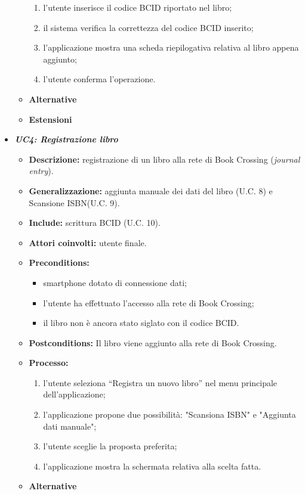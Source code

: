 \begin{itemize}
\begin{itemize}
\begin{enumerate}
			\item l’utente inserisce il codice BCID riportato nel libro;
			\item il sistema verifica la correttezza del codice BCID inserito;
			\item l’applicazione mostra una scheda riepilogativa relativa al libro appena aggiunto;
			\item  l’utente conferma l’operazione.
		\end{enumerate}
		\item \textbf{Alternative}
		\item \textbf{Estensioni}
	\end{itemize}
	\item \textbf{\textit{UC4: Registrazione libro}}
	\begin{itemize}
		\item \textbf{Descrizione:} registrazione di un libro alla rete di Book Crossing (\textit{journal entry}).
		\item \textbf{Generalizzazione:} aggiunta manuale dei dati del libro (U.C. 8) e Scansione ISBN(U.C. 9).
		\item \textbf{Include:} scrittura BCID (U.C. 10).
		\item \textbf{Attori coinvolti:} utente finale.
		\item \textbf{Preconditions:}
		\begin{itemize}
			\item smartphone dotato di connessione dati;
			\item l’utente ha effettuato l’accesso alla rete di Book Crossing;
			\item il libro non è ancora stato siglato con il codice BCID.
		\end{itemize}
		\item \textbf{Postconditions:} Il libro viene aggiunto alla rete di Book Crossing.		
		\item \textbf{Processo:} 
		\begin{enumerate}
			\item l’utente seleziona “Registra un nuovo libro” nel menu principale dell’applicazione;
			\item l’applicazione propone due possibilità: "Scansiona ISBN" e "Aggiunta dati manuale";
			\item l’utente sceglie la proposta preferita;
			\item l’applicazione mostra la schermata relativa alla scelta fatta.
		\end{enumerate}
		\item \textbf{Alternative}

\end{itemize}
\end{itemize}

